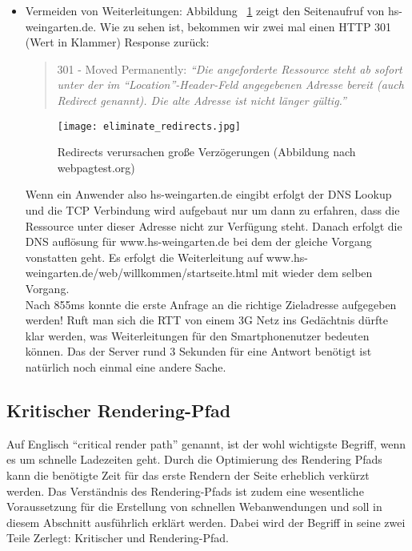 \begin{itemize}
			\item Vermeiden von Weiterleitungen: Abbildung ~\ref{fig:eliminate_redirects} zeigt den Seitenaufruf von hs-weingarten.de. Wie zu sehen ist, bekommen wir zwei mal einen HTTP 301 (Wert in Klammer) Response zurück: 

			\begin{quote}
				301 - Moved Permanently: \textit{"`Die angeforderte Ressource steht ab sofort unter der im "`Location"'-Header-Feld angegebenen Adresse bereit (auch Redirect genannt). Die alte Adresse ist nicht länger gültig."'} \autocite{wikipediaHTTP}
			\end{quote}

			\begin{figure}[htbp]
				\begin{center}
					\texttt{[image: eliminate\_redirects.jpg]}
					\caption{Redirects verursachen große Verzögerungen (Abbildung nach webpagtest.org)}
					\label{fig:eliminate_redirects}
				\end{center}
			\end{figure}
			
			Wenn ein Anwender also hs-weingarten.de eingibt erfolgt der DNS Lookup und die TCP Verbindung wird aufgebaut nur um dann zu erfahren, dass die Ressource unter dieser Adresse nicht zur Verfügung steht. Danach erfolgt die DNS auflösung für www.hs-weingarten.de bei dem der gleiche Vorgang vonstatten geht. Es erfolgt die Weiterleitung auf www.hs-weingarten.de/web/willkommen/startseite.html mit wieder dem selben Vorgang.\\


			Nach 855ms konnte die erste Anfrage an die richtige Zieladresse aufgegeben werden! Ruft man sich die RTT von einem 3G Netz ins Gedächtnis dürfte klar werden, was Weiterleitungen für den Smartphonenutzer bedeuten können. Das der Server rund 3 Sekunden für eine Antwort benötigt ist natürlich noch einmal eine andere Sache.

		\end{itemize}

	\pagebreak



	\subsection{Kritischer Rendering-Pfad} %
	\label{sub:critical_render_path}
		Auf Englisch "`critical render path"' genannt, ist der wohl wichtigste Begriff, wenn es um schnelle Ladezeiten geht. Durch die Optimierung des Rendering Pfads kann die benötigte Zeit für das erste Rendern der Seite erheblich verkürzt werden. Das Verständnis des Rendering-Pfads ist zudem eine wesentliche Voraussetzung für die Erstellung von schnellen Webanwendungen und soll in diesem Abschnitt ausführlich erklärt werden. Dabei wird der Begriff in seine zwei Teile Zerlegt: Kritischer und Rendering-Pfad.\\


